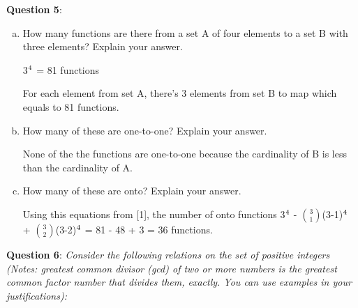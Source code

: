 \documentclass{article} %
\newcommand{\question}[2][]{\begin{flushleft}
        \textbf{Question #1}: \textit{#2}

\end{flushleft}}
\begin{document}
    \question[5]{}
    \begin{enumerate}[(a)]
      \item {How many functions are there from a set A of four elements to a set B with three elements? Explain your answer.}
      
      3$\textsuperscript{4}$ = 81 functions

      For each element from set A, there's 3 elements from set B to map which equals to 81 functions.
      \item {How many of these are one-to-one? Explain your answer.}
      
      None of the the functions are one-to-one because the cardinality of B is less than the cardinality of A.
      \item {How many of these are onto? Explain your answer.}
      
      Using this equations from [1], the number of onto functions 3$\textsuperscript{4}$ - $\binom{3}{1}$(3-1)$\textsuperscript{4}$ + $\binom{3}{2}$(3-2)$\textsuperscript{4}$ = 81 - 48 + 3 = 36 functions.
      
    \end{enumerate}

    \question[6]{Consider the following relations on the set of positive integers (Notes: greatest
    common divisor (gcd) of two or more numbers is the greatest common factor number that divides them,
    exactly. You can use examples in your justifications):}
\end{document}
